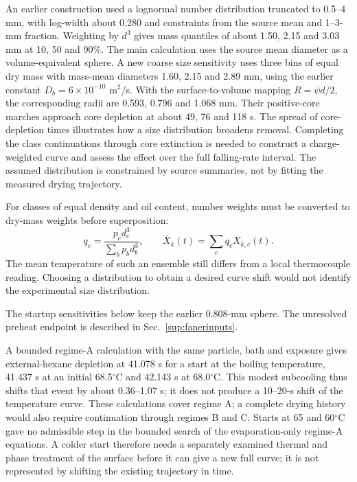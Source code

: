 \documentclass[11pt]{article}
\begin{document}
An earlier construction used a lognormal number
distribution truncated to 0.5--4 mm, with log-width about 0.280 and
constraints from the source mean and 1--3-mm fraction. Weighting by $d^3$
gives mass quantiles of about 1.50, 2.15 and 3.03 mm at 10, 50 and 90\%.
The main calculation uses the source mean diameter as a volume-equivalent
sphere. A new coarse size sensitivity uses three bins of equal dry mass
with mass-mean diameters 1.60, 2.15 and 2.89 mm, using the earlier constant
$D_b=6\times10^{-10}$ m$^2$/s. With the surface-to-volume
mapping $R=\psi d/2$, the corresponding radii are 0.593, 0.796 and
1.068 mm. Their positive-core marches approach core depletion at
about 49, 76 and 118 s. The spread of core-depletion times illustrates how a size distribution
broadens removal. Completing the class continuations through core extinction
is needed to construct a charge-weighted curve and assess the effect over
the full falling-rate interval.
The assumed distribution is constrained by source summaries, not by fitting
the measured drying trajectory.

For classes of equal density and oil content, number weights must be
converted to dry-mass weights before superposition:
\[
q_c=\frac{p_c d_c^3}{\sum_b p_b d_b^3},\qquad
\overline X_k(t)=\sum_c q_c X_{k,c}(t).
\]
The mean temperature of such an ensemble still differs from a local
thermocouple reading. Choosing a distribution to obtain a desired curve
shift would not identify the experimental size distribution.

The startup sensitivities below keep the earlier 0.808-mm sphere.
The unresolved preheat endpoint is described in Sec.~\ref{sup:fanerinputs}.

A bounded
regime-A calculation with the same particle, bath and exposure gives
external-hexane depletion at 41.078 s for a start at the boiling
temperature, 41.437 s at an initial 68.5$^\circ$C and 42.143 s at
68.0$^\circ$C. This modest subcooling thus shifts that event by about
0.36--1.07 s; it does not produce a 10--20-s shift of the temperature curve.
These calculations cover regime A; a complete drying history would
also require continuation through regimes B and C.
Starts at 65 and 60$^\circ$C gave no admissible step in the bounded search
of the evaporation-only regime-A equations. A colder start therefore needs a
separately examined thermal and phase treatment of the surface before it
can give a new full curve; it is not represented by shifting the existing
trajectory in time.
\end{document}

